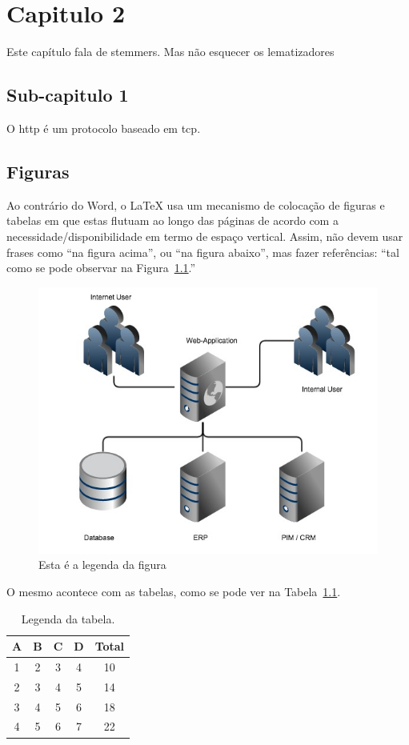 
\chapter{Capitulo 2}

Este capítulo fala de \gls{stemmer}s. Mas não esquecer os \Gls{lematizador}es

\section{Sub-capitulo 1}

O \acrfull{http} é um protocolo baseado em \acrshort{tcp}.

\section{Figuras}

Ao contrário do Word, o \LaTeX{} usa um mecanismo de colocação de figuras e tabelas em que estas
flutuam ao longo das páginas de acordo com a necessidade/disponibilidade em termo de espaço vertical.
Assim, não devem usar frases como ``na figura acima'', ou ``na figura abaixo'', mas fazer referências:
``tal como se pode observar na Figura~\ref{fig:1}.''

\begin{figure}[htb]
    \centering
    \includegraphics[width=0.8\linewidth]{img/sample}  %
    \caption{Esta é a legenda da figura}
    \label{fig:1}
\end{figure}

O mesmo acontece com as tabelas, como se pode ver na Tabela~\ref{tab:1}.

\begin{table}[htb]
    \centering
    \begin{tabular}{ccccc}
        \toprule
        \textbf{A} & \textbf{B} & \textbf{C} & \textbf{D} & \textbf{Total} \\
        \midrule
          1 & 2 & 3 & 4 & 10  \\
          2 & 3 & 4 & 5 & 14  \\
          3 & 4 & 5 & 6 & 18  \\
          4 & 5 & 6 & 7 & 22  \\
         \bottomrule
    \end{tabular}
    \caption{Legenda da tabela.}
    \label{tab:1}
\end{table}

